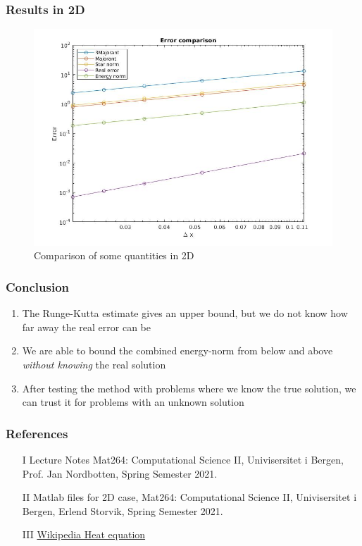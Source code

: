 \documentclass[t]{beamer}
\begin{document}
\begin{frame}
\frametitle{Results in 2D}
\begin{figure}[t]
\centering
\includegraphics[width = 0.7\linewidth]{../../Images/errorcomparison2d.jpg}
\caption{Comparison of some quantities in 2D}
\end{figure}
\end{frame}

\begin{frame}
\frametitle{Conclusion}
\begin{enumerate}
\item The Runge-Kutta estimate gives an upper bound, but we do not know how far away the real error can be
\item We are able to bound the combined energy-norm from below and above \textit{without knowing} the real solution
\item After testing the method with problems where we know the true solution, we can trust it for problems with an unknown solution
\end{enumerate}
\end{frame}

\begin{frame}
\frametitle{References}
\begin{enumerate}
\item[I] Lecture Notes Mat264: Computational Science II, Univisersitet i Bergen, Prof. Jan Nordbotten, Spring Semester 2021.
\item[II] Matlab files for 2D case, Mat264: Computational Science II, Univisersitet i Bergen,  Erlend Storvik, Spring Semester 2021.
\item[III]  \href{https://en.wikipedia.org/wiki/Heat_equation\#Specific_examples}{Wikipedia Heat equation}
\end{enumerate}
\end{frame}
\end{document}
